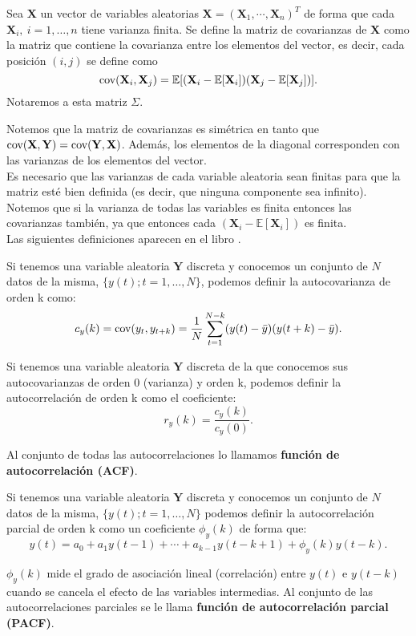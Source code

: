 \begin{definicion}
	Sea $\mathbf{X}$ un vector de variables aleatorias $\mathbf{X}=(\mathbf{X}_1, \cdots, \mathbf{X}_n)^T$ de forma que cada $\mathbf{X}_i,\ i=1, \dots, n$ tiene varianza finita. Se define la matriz de covarianzas de $\mathbf{X}$ como la matriz que contiene la covarianza entre los elementos del vector, es decir, cada posición $(i,j)$ se define como 
	\[ \text{cov}{(\mathbf{X}_i, \mathbf{X}_j)} = \mathbb{E}[(\mathbf{X}_i - \mathbb{E}[\mathbf{X}_i])(\mathbf{X}_j - \mathbb{E}[\mathbf{X}_j])].	\]
	Notaremos a esta matriz $\Sigma$.
\end{definicion}

Notemos que la matriz de covarianzas es simétrica en tanto que $\text{cov}{(\mathbf{X}, \mathbf{Y})} = \text{cov}{(\mathbf{Y}, \mathbf{X})}$. Además, los elementos de la diagonal corresponden con las varianzas de los elementos del vector.\\

Es necesario que las varianzas de cada variable aleatoria sean finitas para que la matriz esté bien definida (es decir, que ninguna componente sea infinito). Notemos que si la varianza de todas las variables es finita entonces las covarianzas también, ya que entonces cada $(\mathbf{X}_i - \mathbb{E}[\mathbf{X}_i])$ es finita.\\

Las siguientes definiciones aparecen en el libro \cite{box08}.

\begin{definicion}
Si tenemos una variable aleatoria $\mathbf{Y}$ discreta y conocemos un conjunto de $N$ datos de la misma, $\{y(t); t=1,\dots,N\}$, podemos definir la autocovarianza de orden k como:
\[	c_y(k) = \text{cov}{(y_t, y_{t+k})} = \frac{1}{N} \sum_{t=1}^{N-k}(y(t)-\bar{y})(y(t+k)-\bar{y}).	\]
\end{definicion}

\begin{definicion}
Si tenemos una variable aleatoria $\mathbf{Y}$ discreta de la que conocemos sus autocovarianzas de orden 0 (varianza) y orden k, podemos definir la autocorrelación de orden k como el coeficiente:
\[	r_y(k) = \frac{c_y(k)}{c_y(0)}.	\]

Al conjunto de todas las autocorrelaciones lo llamamos \textbf{función de autocorrelación (ACF)}.
\end{definicion}

\begin{definicion}
Si tenemos una variable aleatoria $\mathbf{Y}$ discreta y conocemos un conjunto de $N$ datos de la misma, $\{y(t); t=1,\dots,N\}$ podemos definir la autocorrelación parcial de orden k como un coeficiente $\phi_y(k)$ de forma que:
\[	y(t) = a_0 + a_1y(t-1)+\cdots + a_{k-1}y(t-k+1) + \phi_y(k)y(t-k).	\]

$\phi_y(k)$ mide el grado de asociación lineal (correlación) entre $y(t)$ e $y(t-k)$ cuando se cancela el efecto de las variables intermedias. Al conjunto de las autocorrelaciones parciales se le llama \textbf{función de autocorrelación parcial (PACF)}.
\end{definicion}

